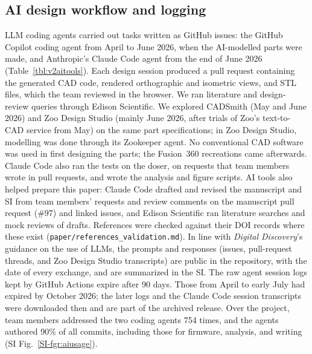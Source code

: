 \documentclass[twoside,twocolumn,9pt]{article}
\newcommand{\siref}[1]{\ref*{SI-#1}}
\begin{document}
\subsection{AI design workflow and logging}
LLM coding agents carried out tasks written as GitHub issues: the GitHub Copilot coding agent from April to June 2026, when the AI-modelled parts were made, and Anthropic's Claude Code agent from the end of June 2026 (Table~\ref{tbl:v2aitools}). Each design session produced a pull request containing the generated CAD code, rendered orthographic and isometric views, and STL files, which the team reviewed in the browser. We ran literature and design-review queries through Edison Scientific. We explored CADSmith (May and June 2026) and Zoo Design Studio (mainly June 2026, after trials of Zoo's text-to-CAD service from May) on the same part specifications; in Zoo Design Studio, modelling was done through its Zookeeper agent. No conventional CAD software was used in first designing the parts; the Fusion~360 recreations came afterwards. Claude Code also ran the tests on the doser, on requests that team members wrote in pull requests, and wrote the analysis and figure scripts. AI tools also helped prepare this paper: Claude Code drafted and revised the manuscript and SI from team members' requests and review comments on the manuscript pull request (\#97) and linked issues, and Edison Scientific ran literature searches and mock reviews of drafts. References were checked against their DOI records where these exist (\texttt{paper/references\_validation.md}). In line with \textit{Digital Discovery}'s guidance on the use of LLMs, the prompts and responses (issues, pull-request threads, and Zoo Design Studio transcripts) are public in the repository, with the date of every exchange, and are summarized in the SI. The raw agent session logs kept by GitHub Actions expire after 90 days. Those from April to early July had expired by October 2026; the later logs and the Claude Code session transcripts were downloaded then and are part of the archived release. Over the project, team members addressed the two coding agents 754 times, and the agents authored 90\% of all commits, including those for firmware, analysis, and writing (SI Fig.~\siref{fgr:aiusage}).


\end{document}
